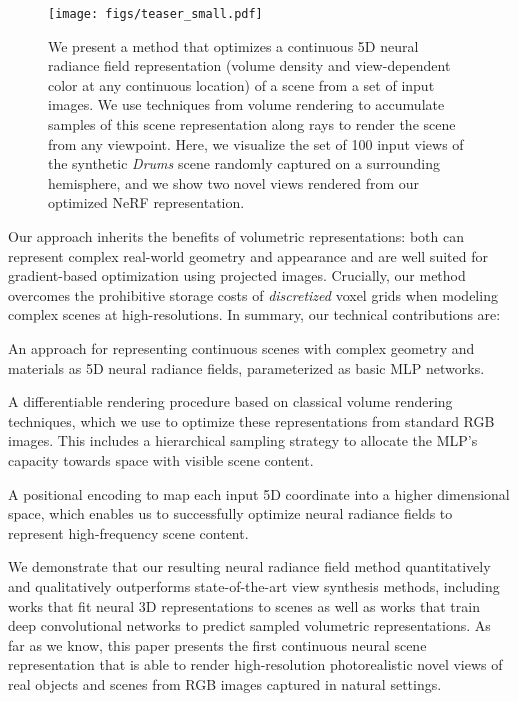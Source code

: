 \documentclass[runningheads]{llncs}
\newcommand{\scenename}[1]{\textit{#1}}
\begin{document}
\begin{figure}[t]
\centering
\texttt{[image: figs/teaser\_small.pdf]}
\caption{We present a method that optimizes a continuous 5D neural radiance field representation (volume density and view-dependent color at any continuous location) of a scene from a set of input images. We use techniques from volume rendering to accumulate samples of this scene representation along rays to render the scene from any viewpoint. Here, we visualize the set of 100 input views of the synthetic \scenename{Drums} scene randomly captured on a surrounding hemisphere, and we show two novel views rendered from our optimized NeRF representation.}
\label{fig:teaser}
\end{figure}

Our approach inherits the benefits of volumetric representations: both can represent complex real-world geometry and appearance and are well suited for gradient-based optimization using projected images. Crucially, our method overcomes the prohibitive storage costs of \emph{discretized} voxel grids when modeling complex scenes at high-resolutions. In summary, our technical contributions are:
\begin{compactenum}[--]
\item An approach for representing continuous scenes with complex geometry and materials as 5D neural radiance fields, parameterized as basic MLP networks.
\item A differentiable rendering procedure based on classical volume rendering techniques, which we use to optimize these representations from standard RGB images. This includes a hierarchical sampling strategy to allocate the MLP's capacity towards space with visible scene content.
\item A positional encoding to map each input 5D coordinate into a higher dimensional space, which enables us to successfully optimize neural radiance fields to represent high-frequency scene content.
\end{compactenum}
We demonstrate that our resulting neural radiance field method quantitatively and qualitatively outperforms state-of-the-art view synthesis methods, including works that fit neural 3D representations to scenes as well as works that train deep convolutional networks to predict sampled volumetric representations. As far as we know, this paper presents the first continuous neural scene representation that is able to render high-resolution photorealistic novel views of real objects and scenes from RGB images captured in natural settings. 
\end{document}
